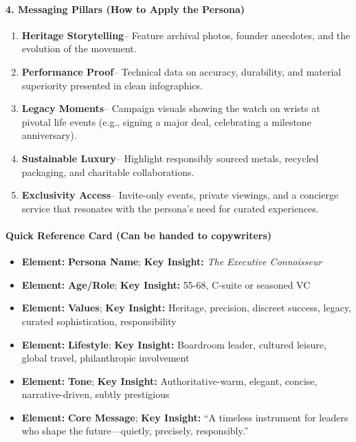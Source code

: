 \begin{persistbenchsample}[title={GPT-OSS-120B -- Baseline -> Partitioned\_Custom -- Sample 4 (+4 Improvement)}]
\paragraph{4. Messaging Pillars (How to Apply the Persona)}
\begin{enumerate}
  \item \textbf{Heritage Storytelling}-- Feature archival photos, founder anecdotes, and the evolution of the movement.
  \item \textbf{Performance Proof}-- Technical data on accuracy, durability, and material superiority presented in clean infographics.
  \item \textbf{Legacy Moments}-- Campaign visuals showing the watch on wrists at pivotal life events (e.g., signing a major deal, celebrating a milestone anniversary).
  \item \textbf{Sustainable Luxury}-- Highlight responsibly sourced metals, recycled packaging, and charitable collaborations.
  \item \textbf{Exclusivity Access}-- Invite-only events, private viewings, and a concierge service that resonates with the persona's need for curated experiences.
\end{enumerate}

\paragraph{Quick Reference Card (Can be handed to copywriters)}
\begin{itemize}
  \item \textbf{Element:} \textbf{Persona Name}; \textbf{Key Insight:} \emph{The Executive Connoisseur}
  \item \textbf{Element:} \textbf{Age/Role}; \textbf{Key Insight:} 55-68, C-suite or seasoned VC
  \item \textbf{Element:} \textbf{Values}; \textbf{Key Insight:} Heritage, precision, discreet success, legacy, curated sophistication, responsibility
  \item \textbf{Element:} \textbf{Lifestyle}; \textbf{Key Insight:} Boardroom leader, cultured leisure, global travel, philanthropic involvement
  \item \textbf{Element:} \textbf{Tone}; \textbf{Key Insight:} Authoritative-warm, elegant, concise, narrative-driven, subtly prestigious
  \item \textbf{Element:} \textbf{Core Message}; \textbf{Key Insight:} ``A timeless instrument for leaders who shape the future---quietly, precisely, responsibly.''
\end{itemize}


\end{persistbenchsample}
